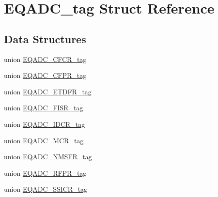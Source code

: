 \hypertarget{structEQADC__tag}{}\section{E\+Q\+A\+D\+C\+\_\+tag Struct Reference}
\label{structEQADC__tag}
\subsection*{Data Structures}
\begin{DoxyCompactItemize}
\item 
union \mbox{\hyperlink{unionEQADC__tag_1_1EQADC__CFCR__tag}{E\+Q\+A\+D\+C\+\_\+\+C\+F\+C\+R\+\_\+tag}}
\item 
union \mbox{\hyperlink{unionEQADC__tag_1_1EQADC__CFPR__tag}{E\+Q\+A\+D\+C\+\_\+\+C\+F\+P\+R\+\_\+tag}}
\item 
union \mbox{\hyperlink{unionEQADC__tag_1_1EQADC__ETDFR__tag}{E\+Q\+A\+D\+C\+\_\+\+E\+T\+D\+F\+R\+\_\+tag}}
\item 
union \mbox{\hyperlink{unionEQADC__tag_1_1EQADC__FISR__tag}{E\+Q\+A\+D\+C\+\_\+\+F\+I\+S\+R\+\_\+tag}}
\item 
union \mbox{\hyperlink{unionEQADC__tag_1_1EQADC__IDCR__tag}{E\+Q\+A\+D\+C\+\_\+\+I\+D\+C\+R\+\_\+tag}}
\item 
union \mbox{\hyperlink{unionEQADC__tag_1_1EQADC__MCR__tag}{E\+Q\+A\+D\+C\+\_\+\+M\+C\+R\+\_\+tag}}
\item 
union \mbox{\hyperlink{unionEQADC__tag_1_1EQADC__NMSFR__tag}{E\+Q\+A\+D\+C\+\_\+\+N\+M\+S\+F\+R\+\_\+tag}}
\item 
union \mbox{\hyperlink{unionEQADC__tag_1_1EQADC__RFPR__tag}{E\+Q\+A\+D\+C\+\_\+\+R\+F\+P\+R\+\_\+tag}}
\item 
union \mbox{\hyperlink{unionEQADC__tag_1_1EQADC__SSICR__tag}{E\+Q\+A\+D\+C\+\_\+\+S\+S\+I\+C\+R\+\_\+tag}}
\end{DoxyCompactItemize}
